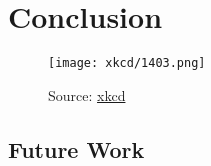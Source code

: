 \chapter{Conclusion}
\label{cha:conclusion}



\begin{figure}[ht]
    \centering
    \texttt{[image: xkcd/1403.png]}
    \caption*{Source: \href{https://xkcd.com/1403/}{xkcd}}
\end{figure}

\section{Future Work}



